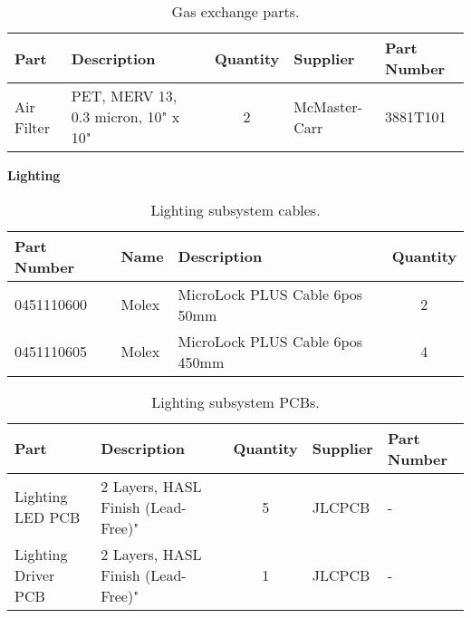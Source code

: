 \begin{table}[!ht]
    \centering
    \begin{tabular}{|l|l|c|l|l|}
    \hline
        Part        & Description                           & Quantity  & Supplier      & Part Number   \\ \hline
        Air Filter  & PET, MERV 13, 0.3 micron, 10" x 10"   & 2         & McMaster-Carr & 3881T101      \\ \hline
    \end{tabular}
    \caption{Gas exchange parts.}
    \label{tab:gas_parts}
\end{table}

\clearpage

\textbf{Lighting}
\begin{table}[!ht]
    \centering
    \begin{tabular}{|l|l|l|c|}
    \hline
        Part Number & Name  & Description                       & Quantity  \\ \hline
        0451110600  & Molex & MicroLock PLUS Cable 6pos 50mm    & 2         \\ \hline
        0451110605  & Molex & MicroLock PLUS Cable 6pos 450mm   & 4         \\ \hline
    \end{tabular}
    \caption{Lighting subsystem cables.}
    \label{tab:lighting_components}
\end{table}

\begin{table}[!ht]
    \centering
    \begin{tabular}{|l|l|c|l|l|}
    \hline
        Part                & Description                           & Quantity  & Supplier  & Part Number   \\ \hline
        Lighting LED PCB    & 2 Layers, HASL Finish (Lead-Free)"    & 5         & JLCPCB    & -             \\ \hline
        Lighting Driver PCB & 2 Layers, HASL Finish (Lead-Free)"    & 1         & JLCPCB    & -             \\ \hline
    \end{tabular}
    \caption{Lighting subsystem PCBs.}
    \label{tab:lighting_parts}
\end{table}

